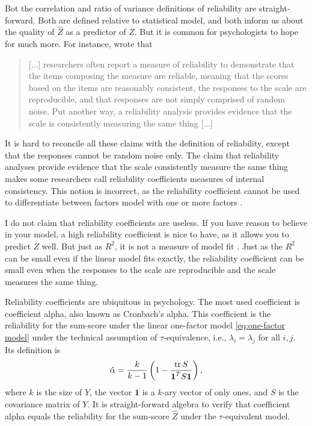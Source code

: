 Bot the correlation and ratio of variance definitions of reliability are straight-forward. Both are defined relative to statistical model, and both inform us about the quality of $\hat{Z}$ as a predictor of $Z$. But it is common for psychologists to hope for much more. For instance, \textcite{McNeish2018-vu} wrote that
\begin{quote} 
[...] researchers often report a measure of reliability to demonstrate that the items composing the measure are reliable, meaning that the scores based on the items are reasonably consistent, the responses to the scale are reproducible, and that responses are not simply comprised of random noise. Put another way, a reliability analysis provides evidence that the scale is consistently measuring the same thing [...]
\end{quote}

It is hard to reconcile all these claims with the definition of reliability, except that the responses cannot be random noise only. The claim that reliability analyses provide evidence that the scale consistently measure the same thing makes some researchers call reliability coefficients measures of internal consistency. This notion is incorrect, as the reliability coefficient cannot be used to differentiate between factors model with one or more factors \parencite[]{McDonald1981-xz}.

I do not claim that reliability coefficients are useless. If you have reason to believe in your model, a high reliability coefficient is nice to have, as it allows you to predict $Z$ well. But just as $R^2$, it is not a measure of model fit \parencite{Helland1987-eb}. Just as the $R^2$ can be small even if the linear model fits exactly, the reliability coefficient can be small even when the responses to the scale are reproducible and the scale measures the same thing. 

Reliability coefficients are ubiquitous in psychology. The most used coefficient is coefficient alpha, also known as Cronbach's alpha. This coefficient is the reliability for the sum-score under the linear one-factor model \eqref{eq:one-factor model} under the technical assumption of $\tau$-equivalence, i.e., $\lambda_i = \lambda_j$ for all $i,j$. Its definition is 
\begin{equation}
\hat{\alpha}=\frac{k}{k-1}\left(1-\frac{\operatorname{tr}{S}}{\boldsymbol{1}^{T}S\boldsymbol{1}}\right),\label{eq:sample coefficient alpha}
\end{equation}
where $k$ is the size of $Y$, the vector $\boldsymbol{1}$ is a $k$-ary vector of only ones, and $S$ is the covariance matrix of $Y$. It is straight-forward algebra to verify that coefficient alpha equals the reliability for the sum-score $\hat{Z}$ under the $\tau$-equivalent model.

